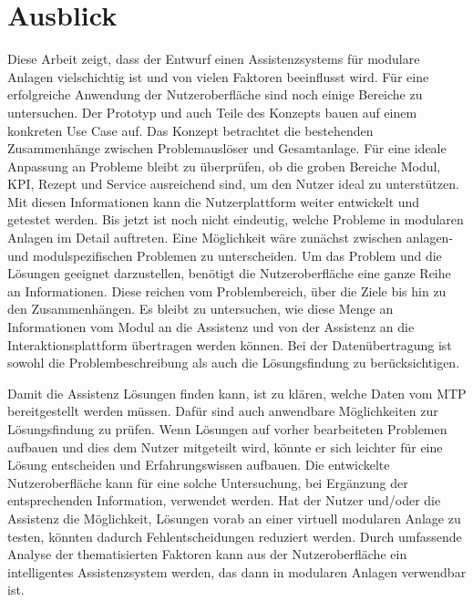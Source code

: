 \section{Ausblick}
Diese Arbeit zeigt, dass der Entwurf einen Assistenzsystems für modulare Anlagen vielschichtig ist und von vielen Faktoren beeinflusst wird. Für eine erfolgreiche Anwendung der Nutzeroberfläche sind noch einige Bereiche zu untersuchen. Der Prototyp und auch Teile des Konzepts bauen auf einem konkreten Use Case auf. Das Konzept betrachtet die bestehenden Zusammenhänge zwischen Problemauslöser und Gesamtanlage. Für eine ideale Anpassung an Probleme bleibt zu überprüfen, ob die groben Bereiche Modul, KPI, Rezept und Service ausreichend sind, um den Nutzer ideal zu unterstützen. Mit diesen Informationen kann die Nutzerplattform weiter entwickelt und getestet werden. Bis jetzt ist noch nicht eindeutig, welche Probleme in modularen Anlagen im Detail auftreten.  Eine Möglichkeit wäre zunächst zwischen anlagen- und modulspezifischen Problemen zu unterscheiden. Um das Problem und die Lösungen geeignet darzustellen, benötigt die Nutzeroberfläche eine ganze Reihe an Informationen. Diese reichen vom Problembereich, über die Ziele bis hin zu den Zusammenhängen. Es bleibt zu untersuchen, wie diese Menge an Informationen vom Modul an die Assistenz und von der Assistenz an die Interaktionsplattform übertragen werden können. Bei der Datenübertragung ist sowohl die Problembeschreibung als auch die Lösungsfindung zu berücksichtigen.

Damit die Assistenz Lösungen finden kann, ist zu klären, welche Daten vom MTP bereitgestellt werden müssen. Dafür sind auch anwendbare Möglichkeiten zur Lösungsfindung zu prüfen. Wenn Lösungen auf vorher bearbeiteten Problemen aufbauen und dies dem Nutzer mitgeteilt wird, könnte er sich leichter für eine Lösung entscheiden und Erfahrungswissen aufbauen. Die entwickelte Nutzeroberfläche kann für eine solche Untersuchung, bei Ergänzung der entsprechenden Information, verwendet werden. Hat der Nutzer und/oder die Assistenz die Möglichkeit, Lösungen vorab an einer virtuell modularen Anlage zu testen, könnten dadurch Fehlentscheidungen reduziert werden. Durch umfassende Analyse der thematisierten Faktoren kann aus der Nutzeroberfläche ein intelligentes Assistenzsystem werden, das dann in modularen Anlagen verwendbar ist.